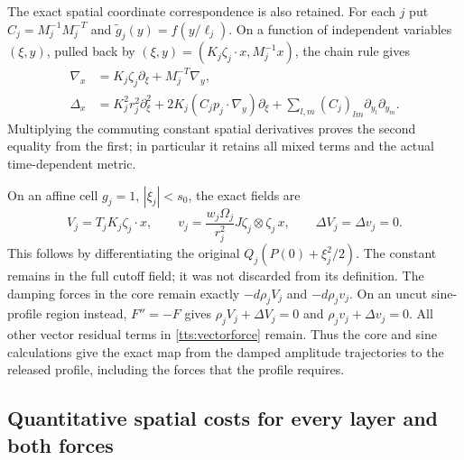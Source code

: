 The exact spatial coordinate correspondence is also retained.
For each $j$ put $C_j=M_j^{-1}M_j^{-T}$ and
$\widetilde g_j(y)=f(y/\ell_j)$. On a function of independent
variables $(\xi,y)$, pulled back by
$(\xi,y)=(K_j\zeta_j\cdot x,M_j^{-1}x)$, the chain rule gives
\begin{equation}\label{tts:metric}
 \begin{split}
 \nabla_x&=K_j\zeta_j\partial_\xi+M_j^{-T}\nabla_y,\\
 \Delta_x&=K_j^2r_j^2\partial_\xi^2
   +2K_j(C_jp_j\cdot\nabla_y)\partial_\xi
   +\sum_{l,m}(C_j)_{lm}\partial_{y_l}\partial_{y_m}.
 \end{split}
\end{equation}
Multiplying the commuting constant spatial derivatives proves the
second equality from the first; in particular it retains all mixed
terms and the actual time-dependent metric.

On an affine cell $g_j=1$, $|\xi_j|<s_0$, the exact fields are
\begin{equation}\label{tts:core}
 V_j=T_jK_j\zeta_j\cdot x,\qquad
 v_j=\frac{w_j\Omega_j}{r_j^2}J\zeta_j\otimes\zeta_j\,x,
 \qquad\Delta V_j=\Delta v_j=0.
\end{equation}
This follows by differentiating the original
$Q_j(P(0)+\xi_j^2/2)$. The constant remains in the full cutoff
field; it was not discarded from its definition. The damping forces
in the core remain exactly $-d\rho_jV_j$ and $-d\rho_jv_j$.
On an uncut sine-profile region instead, $F''=-F$ gives
$\rho_jV_j+\Delta V_j=0$ and
$\rho_jv_j+\Delta v_j=0$. All other vector residual terms in
\eqref{tts:vectorforce} remain. Thus the core and sine calculations
give the exact map from the damped amplitude trajectories to the
released profile, including the forces that the profile requires.

\subsection{Quantitative spatial costs for every layer and both forces}

